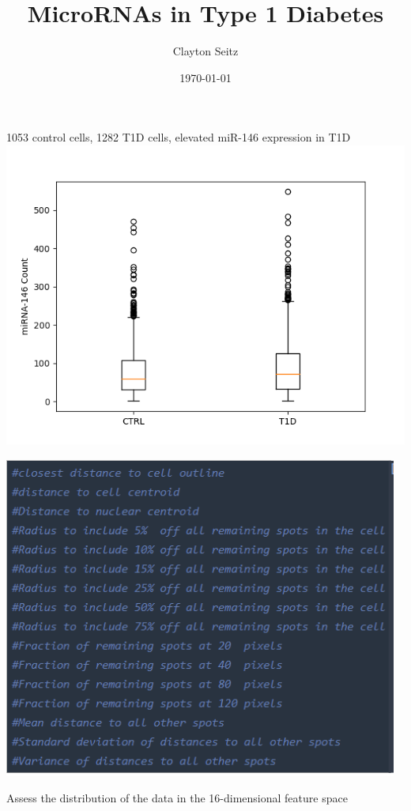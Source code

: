\documentclass[aspectratio=169]{beamer}
\begin{document}
\title{MicroRNAs in Type 1 Diabetes}  
\author{Clayton Seitz}
\date{\today} 

\maketitle


\begin{frame}
1053 control cells, 1282 T1D cells, elevated miR-146 expression in T1D
\includegraphics[scale=0.65]{expression-level}
\end{frame}

\begin{frame}
\includegraphics[scale=0.45]{features}
\end{frame}

\begin{frame}
Assess the distribution of the data in the 16-dimensional feature space
\end{frame}




\begin{thebibliography}{99} 
\end{thebibliography}
\end{document}
